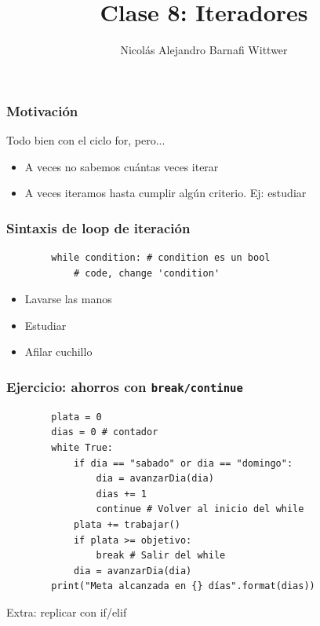 \documentclass[14pt,aspectratio=169,xcolor=dvipsnames]{beamer}
\title[short title]{Clase 8: Iteradores}
\subtitle{}
\author[NA Barnafi] {Nicolás Alejandro Barnafi Wittwer}
\institute[UC|CMM] 
{
    Pontificia Universidad Católica de Chile \\
    Centro de Modelamiento Matemático
}
\begin{document}
\begin{frame}
    \maketitle
\end{frame}
\begin{frame}[fragile]\frametitle{Motivación}
    Todo bien con el ciclo for, pero...

    \begin{itemize}
        \item A veces no sabemos cuántas veces iterar
        \item A veces iteramos hasta cumplir algún criterio. Ej: estudiar
    \end{itemize}
\end{frame}
\begin{frame}[fragile]\frametitle{Sintaxis de loop de iteración}
    \begin{verbatim}
        while condition: # condition es un bool
            # code, change 'condition'
    \end{verbatim}
    
    \vspace{1cm}
    \begin{itemize}
        \item Lavarse las manos
        \item Estudiar
        \item Afilar cuchillo
    \end{itemize}
\end{frame}
\begin{frame}[fragile]\frametitle{Ejercicio: ahorros con \texttt{break/continue}}
\begin{small}
    \begin{verbatim}
        plata = 0
        dias = 0 # contador
        white True: 
            if dia == "sabado" or dia == "domingo": 
                dia = avanzarDia(dia)
                dias += 1
                continue # Volver al inicio del while
            plata += trabajar()
            if plata >= objetivo:
                break # Salir del while
            dia = avanzarDia(dia)
        print("Meta alcanzada en {} días".format(dias))
    \end{verbatim}
    
 Extra: replicar con if/elif
\end{small}
\end{frame}
\end{document}
